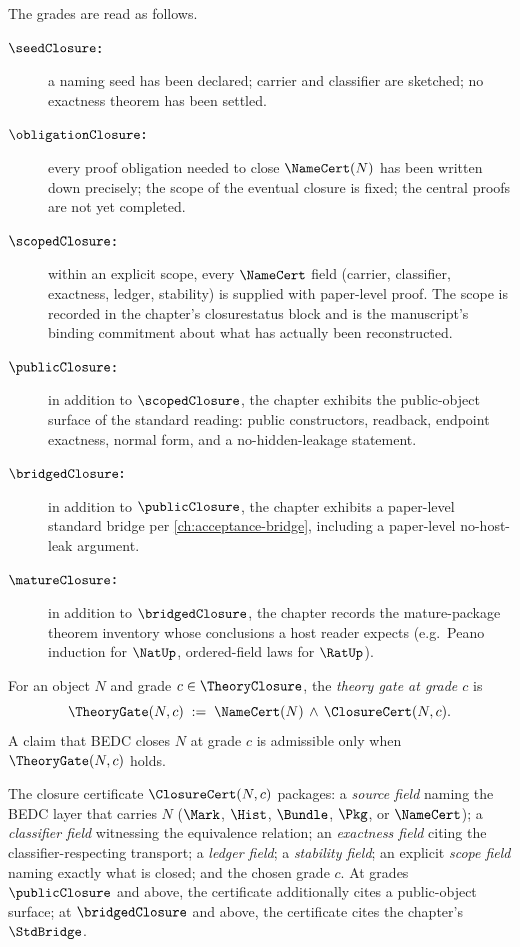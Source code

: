 \begin{definition}
\label{def:theory-closure-interpretations}
The grades are read as follows.
\begin{description}
  \item[\textbf{$\seedClosure$:}] a naming seed has been declared; carrier and classifier are sketched; no exactness theorem has been settled.
  \item[\textbf{$\obligationClosure$:}] every proof obligation needed to close $\NameCert(N)$ has been written down precisely; the scope of the eventual closure is fixed; the central proofs are not yet completed.
  \item[\textbf{$\scopedClosure$:}] within an explicit scope, every $\NameCert$ field (carrier, classifier, exactness, ledger, stability) is supplied with paper-level proof. The scope is recorded in the chapter's closurestatus block and is the manuscript's binding commitment about what has actually been reconstructed.
  \item[\textbf{$\publicClosure$:}] in addition to $\scopedClosure$, the chapter exhibits the public-object surface of the standard reading: public constructors, readback, endpoint exactness, normal form, and a no-hidden-leakage statement.
  \item[\textbf{$\bridgedClosure$:}] in addition to $\publicClosure$, the chapter exhibits a paper-level standard bridge per \autoref{ch:acceptance-bridge}, including a paper-level no-host-leak argument.
  \item[\textbf{$\matureClosure$:}] in addition to $\bridgedClosure$, the chapter records the mature-package theorem inventory whose conclusions a host reader expects (e.g.\ Peano induction for $\NatUp$, ordered-field laws for $\RatUp$).
\end{description}
\end{definition}

\begin{definition}
\label{def:theory-gate}
For an object $N$ and grade $c \in \TheoryClosure$, the \emph{theory gate at grade $c$} is
$$
  \TheoryGate(N, c) \;:=\; \NameCert(N) \,\wedge\, \ClosureCert(N, c).
$$
A claim that BEDC closes $N$ at grade $c$ is admissible only when $\TheoryGate(N, c)$ holds.
\end{definition}

\begin{definition}
\label{def:closure-cert-fields}
The closure certificate $\ClosureCert(N, c)$ packages: a \emph{source field} naming the BEDC layer that carries $N$ ($\Mark$, $\Hist$, $\Bundle$, $\Pkg$, or $\NameCert$); a \emph{classifier field} witnessing the equivalence relation; an \emph{exactness field} citing the classifier-respecting transport; a \emph{ledger field}; a \emph{stability field}; an explicit \emph{scope field} naming exactly what is closed; and the chosen grade $c$. At grades $\publicClosure$ and above, the certificate additionally cites a public-object surface; at $\bridgedClosure$ and above, the certificate cites the chapter's $\StdBridge$.
\end{definition}

